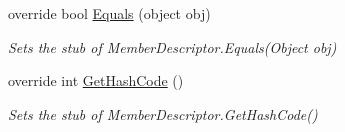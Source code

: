 \begin{DoxyCompactItemize}
override bool \hyperlink{class_system_1_1_component_model_1_1_fakes_1_1_stub_member_descriptor_a42c78387133edfc846141a2bc56b786f}{Equals} (object obj)
\begin{DoxyCompactList}\small\item\em Sets the stub of Member\-Descriptor.\-Equals(\-Object obj)\end{DoxyCompactList}\item 
override int \hyperlink{class_system_1_1_component_model_1_1_fakes_1_1_stub_member_descriptor_aaaaa6f292203b5ac31cf8e7d46e2716d}{Get\-Hash\-Code} ()
\begin{DoxyCompactList}\small\item\em Sets the stub of Member\-Descriptor.\-Get\-Hash\-Code()\end{DoxyCompactList}\end{DoxyCompactItemize}
